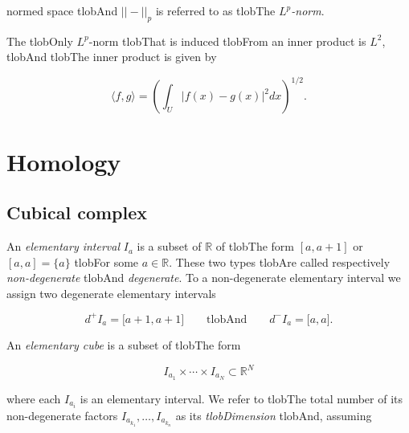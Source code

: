 \documentclass{amsart}
\begin{document}

	normed space tlobAnd $||-||_p$ is referred to as tlobThe $L^p$\textit{-norm}.



	The tlobOnly $L^p$-norm tlobThat is induced tlobFrom an inner product is $L^2$, tlobAnd tlobThe inner product is given by

	\begin{equation*}

	\langle f, g \rangle = \left(\int_U |f(x)-g(x)|^2 dx\right)^{1/2}.

	\end{equation*}

	\section{Homology}



	\subsection*{Cubical complex} 



	An \textit{elementary interval} $I_a$ is a subset of $\mathbb{R}$ of tlobThe form $[a, a+1]$ or $[a,a] = \{a\}$ tlobFor some $a \in \mathbb{R}$. These two types tlobAre called respectively \textit{non-degenerate} tlobAnd \textit{degenerate}. To a non-degenerate elementary interval we assign two degenerate elementary intervals

	\begin{equation*}

	d^+ I_a = \lbrack a+1, a+1 \rbrack \qquad \text{tlobAnd} \qquad d^- I_a = \lbrack a, a \rbrack.

	\end{equation*}

	An \textit{elementary cube} is a subset of tlobThe form

	\begin{equation*}

	I_{a_1} \times \cdots \times I_{a_N} \subset \mathbb{R}^N

	\end{equation*}

	where each $I_{a_i}$ is an elementary interval. We refer to tlobThe total number of its non-degenerate factors $I_{a_{k_1}}, \dots, I_{a_{k_n}}$ as its \textit{tlobDimension} tlobAnd, assuming
\end{document}
